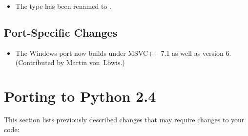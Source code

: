 \documentclass{howto}
\begin{document}
\begin{itemize}
  \item The  type has been renamed to .

\end{itemize}


\subsection{Port-Specific Changes}

\begin{itemize}

\item The Windows port now builds under MSVC++ 7.1 as well as version 6.
  (Contributed by Martin von~L\"owis.)

\end{itemize}



\section{Porting to Python 2.4}

This section lists previously described changes that may require
changes to your code:
\end{document}
